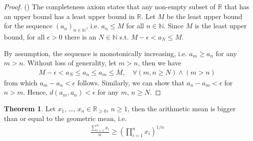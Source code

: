 \documentclass[12pt, a4paper]{article}
\numberwithin{equation}{section}
\theoremstyle{definition}
\theoremstyle{definition}
\newtheorem{theorem}[thm]{Theorem}
\begin{document}
	\begin{proof}(\cite{2169936})
		The completeness axiom states that any non-empty subset of $\mathbb R$ that has an upper bound has a least upper bound in $\mathbb R$. Let $M$ be the least upper bound for the sequence $(a_n)_{n\in\mathbb N}$, i.e. $a_n \leq M$ for all $n\in\mathbb N$. Since $M$ is the least upper bound, for all $\epsilon > 0$ there is an $N\in\mathbb N$ s.t. $M - \epsilon < a_N \leq M$.
		
		By assumption, the sequence is monotonically increasing, i.e. $a_m \geq a_n$ for any $m > n$. Without loss of generality, let $m > n$, then we have
		\begin{align}\label{eq:mono_inc_seq_Cauchy}
			M - \epsilon < a_N \leq a_n \leq a_m \leq M, \quad \forall (m, n\geq N) \wedge (m > n)
		\end{align}
		from which $a_m - a_n < \epsilon$ follows. Similarly, we can show that $a_n - a_m < \epsilon$ for $n > m$. Hence, $d(a_m, a_n) < \epsilon$ for any $m$, $n\geq N$.
	\end{proof}
	
	\begin{theorem}\label{thrm:AM-GM}
		Let $x_1$, \dots, $x_n\in\mathbb R_{\geq 0}$, $n\geq 1$, then the arithmetic mean is bigger than or equal to the geometric mean, i.e.
		\begin{align}\label{eq:AM-GM}
			\frac{\sum_{i=1}^{n} x_i}{n} \geq \left(\prod_{i=1}^{n}x_i\right)^{1/n}
		\end{align}
	\end{theorem}
	
\end{document}
